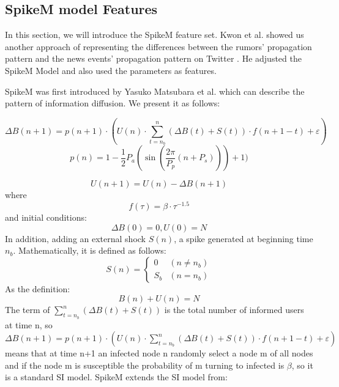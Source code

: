 \clearpage
\subsection{SpikeM model Features}
In this section, we will introduce the SpikeM feature set. Kwon et al. showed us another approach of representing the differences between the rumors' propagation pattern and the news events' propagation pattern on Twitter \cite{kwon2013prominent}. He adjusted the SpikeM Model and also used the parameters as features. 

SpikeM was first introduced by Yasuko Matsubara et al.\cite{conf/kdd/MatsubaraSPLF12} which can describe the pattern of information diffusion. We present it as follows:

\begin{equation}
\Delta B(n + 1) =p(n + 1)\cdot( U(n) \cdot  \sum ^n_{t=n_b}(\Delta B(t) + S(t))\cdot f(n+1-t) + \varepsilon )
\end{equation}
\begin{equation}
\label{periodic}
p(n) = 1-\frac{1}{2}P_a(\sin (\frac{2\pi}{P_p} (n+P_s)))+1)
\end{equation}

\begin{equation}
U(n + 1)=U(n)-\Delta {B(n + 1) }
\end{equation}
where
\begin{equation}
\label{decay}
f(\tau)=\beta \cdot \tau ^{-1.5}
\end{equation}
and initial conditions:
\begin{equation}
 \Delta B(0)=0 ,U(0) = N
\end{equation}
In addition, adding an external shock $S(n)$, a spike generated
at beginning time $n_b$. Mathematically, it is defined as follows:
\begin{equation}
\label{outs}
S(n) =\begin{cases}0 &(n \neq n_b)\\S_b  & (n =n_b)\end{cases} 
\end{equation}
As the definition: 
\begin{equation}
B(n) + U(n) = N
\end{equation}
The term of $\sum ^n_{t=n_b}(\Delta B(t) + S(t))$ is the total number of informed users at time n, so $\Delta B(n + 1) =p(n + 1)\cdot( U(n) \cdot  \sum ^n_{t=n_b}(\Delta B(t) + S(t))\cdot f(n+1-t) + \varepsilon )$ means that at time n+1 an infected node n randomly select a node m of all nodes and if the node m is susceptible the probability of m turning to infected is $\beta$, so it is a standard SI model. SpikeM extends the SI model from: 


